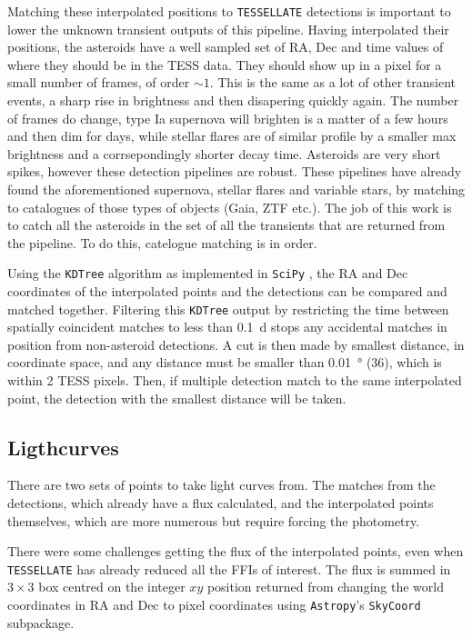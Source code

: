 \documentclass[12pt]{article}
\begin{document}
Matching these interpolated positions to \texttt{TESSELLATE} detections is important to lower the unknown transient outputs of this pipeline.
Having interpolated their positions, the asteroids have a well sampled set of RA, Dec and time values of where they should be in the TESS data.
They should show up in a pixel for a small number of frames, of order $\sim1$.
This is the same as a lot of other transient events, a sharp rise in brightness and then disapering quickly again.
The number of frames do change, type Ia supernova will brighten is a matter of a few hours and then dim for days, while stellar flares are of similar profile by a smaller max brightness and a corrsepondingly shorter decay time.
Asteroids are very short spikes, however these detection pipelines are robust. %
These pipelines have already found the aforementioned supernova, stellar flares and variable stars, by matching to catalogues of those types of objects (Gaia, ZTF etc.).
The job of this work is to catch all the asteroids in the set of all the transients that are returned from the pipeline.
To do this, catelogue matching is in order.

Using the \texttt{KDTree} algorithm \citep{Maneewongvatana1999} as implemented in \texttt{SciPy} \citep{2020SciPy-NMeth}, the RA and Dec coordinates of the interpolated points and the detections can be compared and matched together.
Filtering this \texttt{KDTree} output by restricting the time between spatially coincident matches to less than \qty{0.1}{\day} stops any accidental matches in position from non-asteroid detections.
A cut is then made by smallest distance, in coordinate space, and any distance must be smaller than \qty{0.01}{\degree} (\qty{36}{\arcsec}), which is within 2 TESS pixels.
Then, if multiple detection match to the same interpolated point, the detection with the smallest distance will be taken.


\subsection{Ligthcurves}\label{SubSec:Lightcurves}

There are two sets of points to take light curves from.
The matches from the detections, which already have a flux calculated, and the interpolated points themselves, which are more numerous but require forcing the photometry.

There were some challenges getting the flux of the interpolated points, even when \texttt{TESSELLATE} has already reduced all the FFIs of interest.
The flux is summed in  $3\times3$ box centred on the integer $xy$ position returned from changing the world coordinates in RA and Dec to pixel coordinates using \texttt{Astropy}'s \texttt{SkyCoord} subpackage. %
\end{document}
